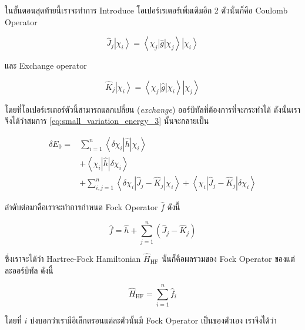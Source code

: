 ในขั้นตอนสุดท้ายนี้เราจะทำการ Introduce โอเปอร์เรเตอร์เพิ่มเติมอีก 2 ตัวนั่นก็คือ Coulomb Operator

\begin{equation}
  \label{eq:coulomb_operator}
  \hat{J}_j\left|\chi_i\right\rangle
  = \left\langle\chi_j|\hat{g}| \chi_j\right\rangle
  \left|\chi_i\right\rangle
\end{equation}

\noindent และ Exchange operator

\begin{equation}
  \label{eq:exchange_operator}
  \hat{K}_j\left|\chi_i\right\rangle
  = \left\langle\chi_j|\hat{g}| \chi_i\right\rangle
  \left|\chi_j\right\rangle
\end{equation}

\noindent โดยที่โอเปอร์เรเตอร์ตัวนี้สามารถแลกเปลี่ยน (\textit{exchange}) ออร์บิทัลที่ต้องการที่จะกระทำได้ ดังนั้นเราจึงได้ว่าสมการ
\eqref{eq:small_variation_energy_3} นั้นจะกลายเป็น

\begin{equation}
  \begin{aligned}
    \delta E_0
    = & \sum_{i=1}^n\left\langle\delta \chi_i|\hat{h}| \chi_i\right\rangle \\
      & +\left\langle\chi_i|\hat{h}| \delta \chi_i\right\rangle            \\
      & +\sum_{i, j=1}^n
    \left\langle
    \delta \chi_i
    \left|\hat{J}_j-\hat{K}_j\right|
    \chi_i
    \right\rangle
    + \left\langle
    \chi_i\left
    |\hat{J}_j-\hat{K}_j\right|
    \delta \chi_i
    \right\rangle
  \end{aligned}
\end{equation}

ลำดับต่อมาคือเราจะทำการกำหนด Fock Operator $\hat{f}$ ดังนี้

\begin{equation}
  \label{eq:fock_operator}
  \hat{f}
  = \hat{h}
  + \sum_{j=1}^n
  \left(
  \hat{J}_j-\hat{K}_j
  \right)
\end{equation}

\noindent ซึ่งเราจะได้ว่า Hartree-Fock Hamiltonian $\hat{H}_{\mathrm{HF}}$ นั้นก็คือผลรวมของ Fock Operator
ของแต่ละออร์บิทัล ดังนี้

\begin{equation}
  \label{eq:total_HF_hamiltonian}
  \hat{H}_{\mathrm{HF}} = \sum_{i=1}^n \hat{f}_i
\end{equation}

\noindent โดยที่ $i$ บ่งบอกว่าเรามีอิเล็กตรอนแต่ละตัวนั้นมี Fock Operator เป็นของตัวเอง เราจึงได้ว่า

